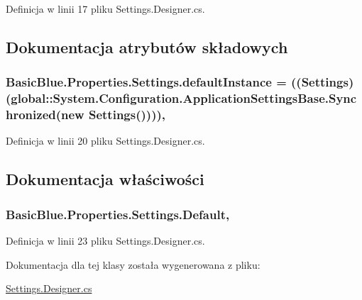 Definicja w linii 17 pliku Settings.\-Designer.\-cs.



\subsection{Dokumentacja atrybutów składowych}
\hypertarget{class_basic_blue_1_1_properties_1_1_settings_ac329771b6b59763541b72b168fe36313}{
\subsubsection[{default\-Instance}]{ Basic\-Blue.\-Properties.\-Settings.\-default\-Instance = (({\bf Settings})(global\-::\-System.\-Configuration.\-Application\-Settings\-Base.\-Synchronized(new {\bf Settings}())))\hspace{0.3cm}{\ttfamily [static]}, {\ttfamily [private]}}}\label{class_basic_blue_1_1_properties_1_1_settings_ac329771b6b59763541b72b168fe36313}


Definicja w linii 20 pliku Settings.\-Designer.\-cs.



\subsection{Dokumentacja właściwości}
\hypertarget{class_basic_blue_1_1_properties_1_1_settings_a89730c8b364a4219d8202678a59dd719}{
\subsubsection[{Default}]{ Basic\-Blue.\-Properties.\-Settings.\-Default\hspace{0.3cm}{\ttfamily [static]}, {\ttfamily [get]}}}\label{class_basic_blue_1_1_properties_1_1_settings_a89730c8b364a4219d8202678a59dd719}


Definicja w linii 23 pliku Settings.\-Designer.\-cs.



Dokumentacja dla tej klasy została wygenerowana z pliku\-:\begin{DoxyCompactItemize}
\item 
\hyperlink{_settings_8_designer_8cs}{Settings.\-Designer.\-cs}\end{DoxyCompactItemize}
